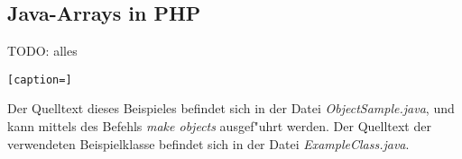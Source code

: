 \subsection{Java-Arrays in PHP}
\label{sec:app1:arrays}
TODO: alles
\begin{lstlisting}[caption=]
\end{lstlisting}

Der Quelltext dieses Beispieles befindet sich in der Datei \emph{ObjectSample.java}, 
und kann mittels des Befehls \emph{make objects} ausgef"uhrt werden. Der Quelltext der
verwendeten Beispielklasse befindet sich in der Datei \emph{ExampleClass.java}.

